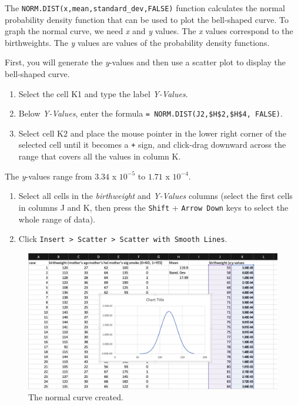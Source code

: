 \documentclass[
]{book}
\providecommand{\tightlist}{%
  \setlength{\itemsep}{0pt}\setlength{\parskip}{0pt}}
\begin{document}
The \texttt{NORM.DIST(x,mean,standard\_dev,FALSE)} function calculates the normal probability density function that can be used to plot the bell-shaped curve. To graph the normal curve, we need \emph{x} and \emph{y} values. The \emph{x} values correspond to the birthweights. The \emph{y} values are values of the probability density functions.

First, you will generate the \emph{y}-values and then use a scatter plot to display the bell-shaped curve.

\begin{enumerate}
\def\labelenumi{\arabic{enumi}.}
\tightlist
\item
  Select the cell K1 and type the label \emph{Y-Values}.
\item
  Below \emph{Y-Values}, enter the formula \texttt{=\ NORM.DIST(J2,\$H\$2,\$H\$4,\ FALSE)}.
\item
  Select cell K2 and place the mouse pointer in the lower right corner of the selected cell until it becomes a \texttt{+} sign, and click-drag downward across the range that covers all the values in column K.
\end{enumerate}

The \emph{y}-values range from \(3.34\) x \(10^{-5}\) to \(1.71\) x \(10^{-4}\).

\begin{enumerate}
\def\labelenumi{\arabic{enumi}.}
\setcounter{enumi}{3}
\tightlist
\item
  Select all cells in the \emph{birthweight} and \emph{Y-Values} columns (select the first cells in columns J and K, then press the \texttt{Shift} + \texttt{Arrow\ Down} keys to select the whole range of data).
\item
  Click \texttt{Insert\ \textgreater{}\ Scatter\ \textgreater{}\ Scatter\ with\ Smooth\ Lines}.
\end{enumerate}

\begin{figure}

{\centering \includegraphics[width=1\linewidth]{normal-curve} 

}

\caption{The normal curve created.}\label{fig:normal-curve}
\end{figure}
\end{document}

